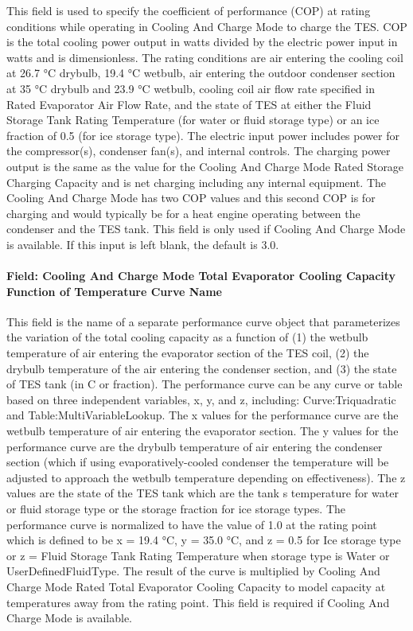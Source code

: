 This field is used to specify the coefficient of performance (COP) at rating conditions while operating in Cooling And Charge Mode to charge the TES. COP is the total cooling power output in watts divided by the electric power input in watts and is dimensionless. The rating conditions are air entering the cooling coil at 26.7 °C drybulb, 19.4 °C wetbulb, air entering the outdoor condenser section at 35 °C drybulb and 23.9 °C wetbulb, cooling coil air flow rate specified in Rated Evaporator Air Flow Rate, and the state of TES at either the Fluid Storage Tank Rating Temperature (for water or fluid storage type) or an ice fraction of 0.5 (for ice storage type). The electric input power includes power for the compressor(s), condenser fan(s), and internal controls. The charging power output is the same as the value for the Cooling And Charge Mode Rated Storage Charging Capacity and is net charging including any internal equipment. The Cooling And Charge Mode has two COP values and this second COP is for charging and would typically be for a heat engine operating between the condenser and the TES tank. This field is only used if Cooling And Charge Mode is available. If this input is left blank, the default is 3.0.

\paragraph{Field: Cooling And Charge Mode Total Evaporator Cooling Capacity Function of Temperature Curve Name}\label{field-cooling-and-charge-mode-total-evaporator-cooling-capacity-function-of-temperature-curve-name}

This field is the name of a separate performance curve object that parameterizes the variation of the total cooling capacity as a function of (1) the wetbulb temperature of air entering the evaporator section of the TES coil, (2) the drybulb temperature of the air entering the condenser section, and (3) the state of TES tank (in C or fraction). The performance curve can be any curve or table based on three independent variables, x, y, and z, including: Curve:Triquadratic and Table:MultiVariableLookup. The x values for the performance curve are the wetbulb temperature of air entering the evaporator section. The y values for the performance curve are the drybulb temperature of air entering the condenser section (which if using evaporatively-cooled condenser the temperature will be adjusted to approach the wetbulb temperature depending on effectiveness). The z values are the state of the TES tank which are the tank s temperature for water or fluid storage type or the storage fraction for ice storage types. The performance curve is normalized to have the value of 1.0 at the rating point which is defined to be x = 19.4 °C, y = 35.0 °C, and z = 0.5 for Ice storage type or z = Fluid Storage Tank Rating Temperature when storage type is Water or UserDefinedFluidType. The result of the curve is multiplied by Cooling And Charge Mode Rated Total Evaporator Cooling Capacity to model capacity at temperatures away from the rating point. This field is required if Cooling And Charge Mode is available.

